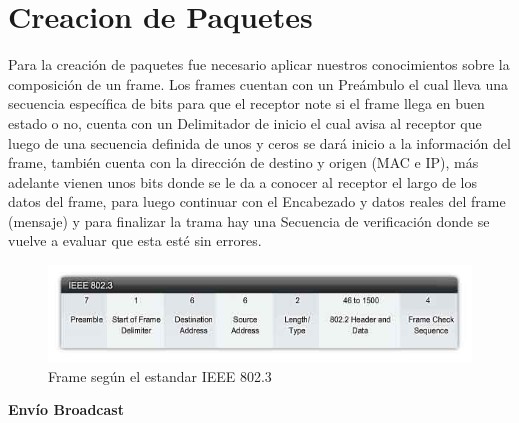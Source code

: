 \documentclass{udpreport}
\begin{document}
	\section{Creacion de Paquetes}
		Para la creación de paquetes fue necesario aplicar nuestros conocimientos sobre la composición de un frame.
		Los frames cuentan con un Preámbulo el cual lleva una secuencia específica de bits para que el receptor note si el
		frame llega en buen estado o no, cuenta con un Delimitador de inicio el cual avisa al receptor que luego de una
		secuencia definida de unos y ceros se dará inicio a la información del frame, también cuenta con la dirección de
		destino y origen (MAC e IP), más adelante vienen unos bits donde se le da a conocer al receptor el largo de los datos
		del frame, para luego continuar con el Encabezado y datos reales del frame (mensaje) y para finalizar la trama hay una
		Secuencia de verificación donde se vuelve a evaluar que esta esté sin errores.\\
		\begin{figure}[H]
		    \centering
		    \includegraphics[width=\textwidth]{frame.jpg}
		    \caption{Frame según el estandar IEEE 802.3}
		\end{figure}
		{\bf \large Envío Broadcast}\\
\end{document}
